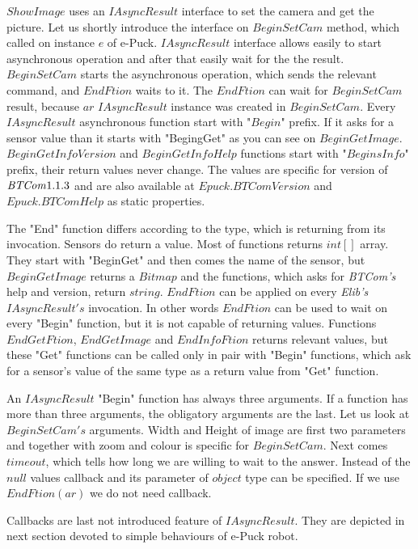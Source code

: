   $ShowImage$ uses an $IAsyncResult$ interface to set the camera and get the picture.
  Let us shortly introduce the interface on $BeginSetCam$ method, which called on instance $e$ of e-Puck.
  $IAsyncResult$ interface allows easily to start asynchronous operation and after that easily wait for the the result.
  $BeginSetCam$ starts the asynchronous operation, which sends the relevant command, and $EndFtion$ waits to it.
  The $EndFtion$ can wait for $BeginSetCam$ result, because $ar$ $IAsyncResult$ instance was created in $BeginSetCam$.
  Every $IAsyncResult$ asynchronous function start with "$Begin$" prefix. 
  If it asks for a sensor value than it starts with "BegingGet" as you can see on $BeginGetImage$.
  $BeginGetInfoVersion$ and $BeginGetInfoHelp$ functions start with "$BeginsInfo$" prefix, their return values never change. 
  The values are specific for version of ${\it BTCom} 1.1.3$ and
  are also available at $Epuck.BTComVersion$ and $Epuck.BTComHelp$ as static properties.

  The "End" function differs according to the type, which is returning from its invocation.
  Sensors do  return a value. Most of functions returns $int[]$ array. They start with "BeginGet" 
  and then comes the name of the sensor, 	but $BeginGetImage$ returns a $Bitmap$ and the functions,
  which asks for {\it BTCom's} help and version, return $string$.
  $EndFtion$ can be applied on every {\it Elib's} $IAsyncResult's$ invocation. 
  In other words $EndFtion$ can be used to wait on every "Begin" function, but
  it is not capable of returning values. Functions $EndGetFtion$, $EndGetImage$ and $EndInfoFtion$ returns relevant values, but
  these "Get" functions can be called only in pair with "Begin" functions, which ask for a sensor's value 
  of the same type as a return value from "Get" function.

  An $IAsyncResult$ "Begin" function has always three arguments. If a function has more than three arguments, the obligatory arguments are the last.
  Let us look at $BeginSetCam's$ arguments. Width and Height of image are first two parameters 
  and together with zoom and colour is specific for $BeginSetCam$.
  Next comes $timeout$, which tells how long we are willing to wait to the answer. 
  Instead of the $null$ values callback and its parameter of $object$ type can be specified.
  If we use $EndFtion(ar)$ we do not need callback.

  Callbacks are last not introduced feature of $IAsyncResult$. They are depicted in next section devoted to simple behaviours of e-Puck robot.
